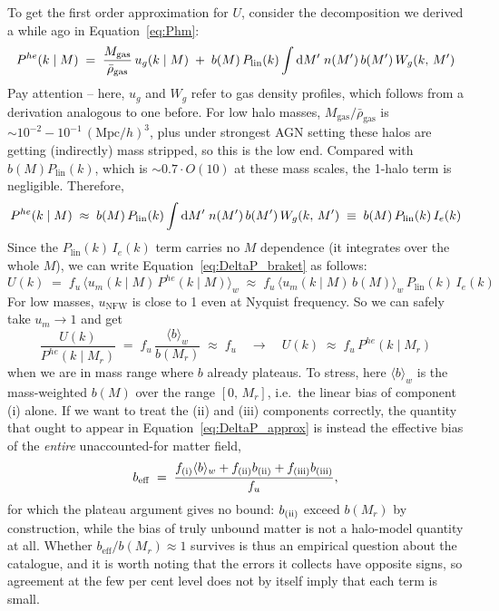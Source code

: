 \documentclass{article}
\newcommand{\dd}{\mathrm{d}}
\begin{document}
To get the first order approximation for $U$, consider the decomposition we derived a while ago in Equation~\ref{eq:Phm}:
\[
P^{he}(k \mid M) \;=\; \frac{M_\mathrm{gas}}{\bar \rho_\mathrm{gas}}  \, u_g(k \mid M)\;+\; b(M) \, P_{\rm lin}(k)
    \int \dd M' \; n(M') \, b(M') \, W_g(k,\, M')
\]
Pay attention -- here, $u_g$ and $W_g$ refer to gas density profiles, which follows from a derivation analogous to one before. For low halo masses, ${M_\mathrm{gas}}/{\bar \rho_\mathrm{gas}}$ is $\sim 10^{-2}-10^{-1} \, (\text{Mpc}/h)^3$, plus under strongest AGN setting these halos are getting (indirectly) mass stripped, so this is the low end. Compared with $b(M)P_\mathrm{lin}(k)$, which is $\sim 0.7 \cdot O(10)$ at these mass scales, the 1-halo term is negligible. Therefore, 
\[
P^{he}(k \mid M) \;\approx\; b(M) \, P_{\rm lin}(k)
    \int \dd M' \; n(M') \, b(M') \, W_g(k, \,M') \;\equiv\; b(M) \, P_\mathrm{lin}(k)\, I_e(k)
\]
Since the $P_\mathrm{lin}(k)\, I_e(k)$ term carries no $M$ dependence (it integrates over the whole $M$), we can write Equation~\ref{eq:DeltaP_braket} as follows:
\begin{equation}
    U(k) \;=\; f_u \,\langle u_m(k\mid M)\, P^{he}(k \mid M) \rangle_w \;\approx\; f_u \, \langle u_m(k\mid M)\, b(M) \rangle_w \, P_\mathrm{lin}(k)\, I_e(k)
\end{equation}
For low masses, $u_\mathrm{NFW}$ is close to 1 even at Nyquist frequency. So we can safely take $u_m \rightarrow 1$ and get 
\begin{equation} \label{eq:DeltaP_approx}
    \frac{U(k)}{P^{he}(k \mid M_r)} \;=\; f_u \, \frac{\langle b\rangle_w}{b(M_r)} \;\approx\; f_u \quad \rightarrow \quad U(k) \;\approx\; f_u \, P^{he}(k \mid M_r) 
\end{equation}
when we are in mass range where $b$ already plateaus. To stress, here $\langle b\rangle_w$ is the mass-weighted $b(M)$ over the range $[0, \, M_r]$, i.e.\ the linear bias of component (i) alone. If we want to treat the (ii) and (iii) components correctly, the quantity that ought to appear in Equation~\eqref{eq:DeltaP_approx} is instead the effective bias of the \emph{entire} unaccounted-for matter field,
\begin{equation} \label{eq:b_eff}
    b_{\rm eff} \;=\; \frac{f_{\rm (i)} \langle b \rangle_w + f_{\rm (ii)} b_{\rm (ii)} + f_{\rm (iii)} b_{\rm (iii)}}{f_u},
\end{equation}
for which the plateau argument gives no bound: $b_{\rm (ii)}$ exceed $b(M_r)$ by construction, while the bias of truly unbound matter is not a halo-model quantity at all. Whether $b_\mathrm{eff}/b(M_r) \approx 1$ survives is thus an empirical
question about the catalogue, and it is worth noting that the errors it collects have opposite signs, so agreement
at the few per cent level does not by itself imply that each term is small.
\end{document}
